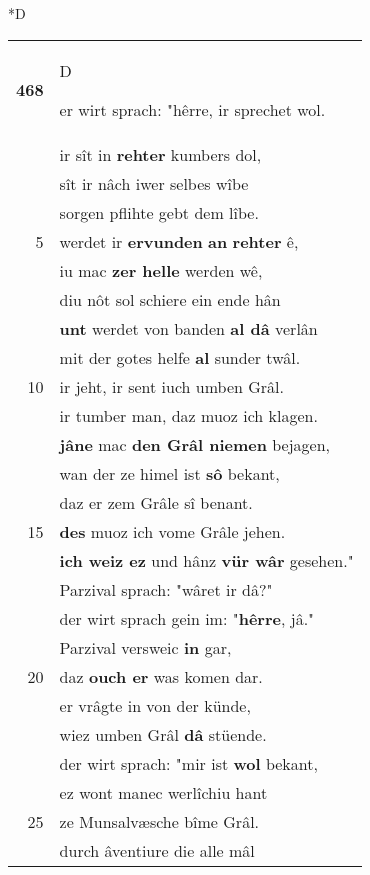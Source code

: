 \documentclass[8pt,a4paper,notitlepage]{article}
\begin{document}
\begin{table}[ht]
\begin{minipage}[t]{0.5\linewidth}
\small
\begin{center}*D
\end{center}
\begin{tabular}{rl}
\textbf{468} & \begin{large}D\end{large}er wirt sprach: "hêrre, ir sprechet wol.\\ 
 & ir sît in \textbf{rehter} kumbers dol,\\ 
 & sît ir nâch iwer selbes wîbe\\ 
 & sorgen pflihte gebt dem lîbe.\\ 
5 & werdet ir \textbf{ervunden} \textbf{an} \textbf{rehter} ê,\\ 
 & iu mac \textbf{zer helle} werden wê,\\ 
 & diu nôt sol schiere ein ende hân\\ 
 & \textbf{unt} werdet von banden \textbf{al dâ} verlân\\ 
 & mit der gotes helfe \textbf{al} sunder twâl.\\ 
10 & ir jeht, ir sent iuch umben Grâl.\\ 
 & ir tumber man, daz muoz ich klagen.\\ 
 & \textbf{jâ}\textbf{ne} mac \textbf{den Grâl niemen} bejagen,\\ 
 & wan der ze himel ist \textbf{sô} bekant,\\ 
 & daz er zem Grâle sî benant.\\ 
15 & \textbf{des} muoz ich vome Grâle jehen.\\ 
 & \textbf{ich weiz ez} und hânz \textbf{vür wâr} gesehen."\\ 
 & Parzival sprach: "wâret ir dâ?"\\ 
 & der wirt sprach gein im: "\textbf{hêrre}, jâ."\\ 
 & Parzival versweic \textbf{in} gar,\\ 
20 & daz \textbf{ouch er} was komen dar.\\ 
 & er vrâgte in von der künde,\\ 
 & wiez umben Grâl \textbf{dâ} stüende.\\ 
 & der wirt sprach: "mir ist \textbf{wol} bekant,\\ 
 & ez wont manec werlîchiu hant\\ 
25 & ze Munsalvæsche bîme Grâl.\\ 
 & durch âventiure die alle mâl\\ 

\end{tabular}
\end{minipage}
\end{table}
\end{document}
